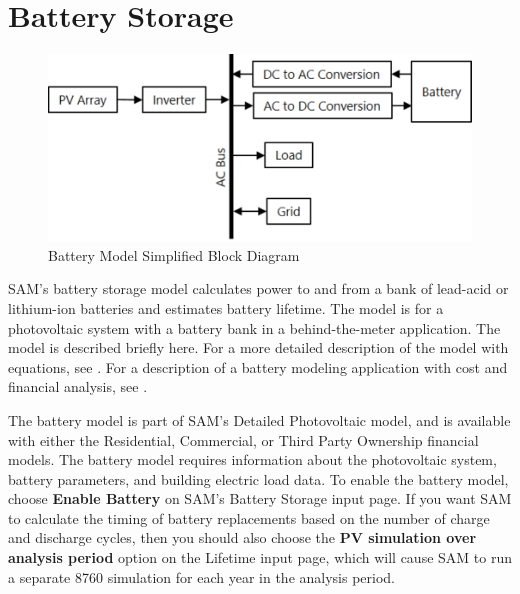 \documentclass[12pt,letterpaper]{article}
\begin{document}
\chapter{Battery Storage}\label{sec-battery}

\begin{figure}
\begin{center}
\includegraphics[scale=0.5]{battery-schematic}
\caption{Battery Model Simplified Block Diagram}
\label{fig-batteryschematic}
\end{center}
\end{figure}

SAM's battery storage model calculates power to and from a bank of lead-acid or lithium-ion batteries and estimates battery lifetime. The model is for a photovoltaic system with a battery bank in a behind-the-meter application.  The model is described briefly here. For a more detailed description of the model with equations, see \citet{diorio2015a}. For a description of a battery modeling application with cost and financial analysis, see \citet{diorio2015b}.

The battery model is part of SAM's Detailed Photovoltaic model, and is available with either the Residential, Commercial, or Third Party Ownership financial models. The battery model requires information about the photovoltaic system, battery parameters, and building electric load data. To enable the battery model, choose \textbf{Enable Battery} on SAM's Battery Storage input page. If you want SAM to calculate the timing of battery replacements based on the number of charge and discharge cycles, then you should also choose the \textbf{PV simulation over analysis period} option on the Lifetime input page, which will cause SAM to run a separate 8760 simulation for each year in the analysis period.
\end{document}
